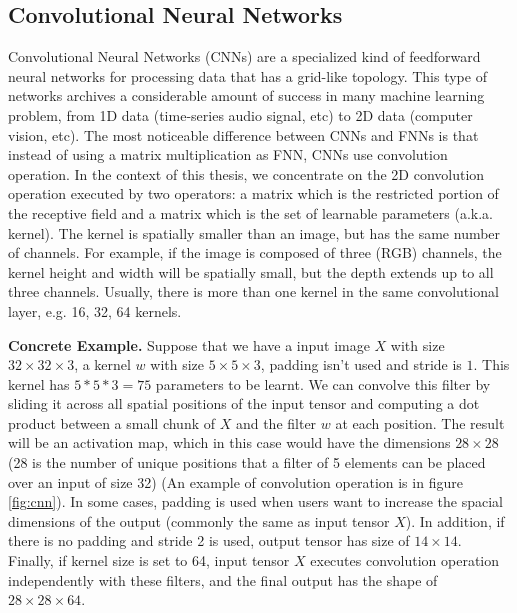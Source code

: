 \subsection{Convolutional Neural Networks}
Convolutional Neural Networks (CNNs) are a specialized kind of feedforward neural networks for processing data that has a grid-like topology. This type of networks archives a considerable amount of success in many machine learning problem, from 1D data (time-series audio signal, etc) to 2D data (computer vision, etc). The most noticeable difference between CNNs and FNNs is that instead of using a matrix multiplication as FNN, CNNs use convolution operation. In the context of this thesis, we concentrate on the 2D convolution operation executed by two operators: a matrix which is the restricted portion of the receptive field and a matrix which is the set of learnable parameters (a.k.a. kernel). The kernel is spatially smaller than an image, but has the same number of channels. For example, if the image is composed of three (RGB) channels, the kernel height and width will be spatially small, but the depth extends up to all three channels. Usually, there is more than one kernel in the same convolutional layer, e.g. 16, 32, 64 kernels.

\textbf{Concrete Example.} Suppose that we have a input image $\displaystyle X$ with size \newline $\displaystyle 32 \times 32 \times 3$, a kernel $\displaystyle w$ with size $\displaystyle 5 \times 5 \times 3$, padding isn't used and stride is $1$. This kernel has $\displaystyle 5 * 5 * 3 = 75$ parameters to be learnt. We can convolve this filter by sliding it across all spatial positions of the input tensor and computing a dot product between a small chunk of $\displaystyle X$ and the filter $\displaystyle w$ at each position. The result will be an activation map, which in this case would have the dimensions $\displaystyle 28 \times 28$ (28 is the number of unique positions that a filter of 5 elements can be placed over an input of size 32) (An example of convolution operation is in figure \ref{fig:cnn}). In some cases, padding is used when users want to increase the spacial dimensions of the output (commonly the same as input tensor $\displaystyle X$). In addition, if there is no padding and stride 2 is used, output tensor has size of $\displaystyle 14 \times 14$. Finally, if kernel size is set to 64, input tensor $\displaystyle X$ executes convolution operation independently with these filters, and the final output has the shape of $\displaystyle 28 \times 28 \times 64$.

